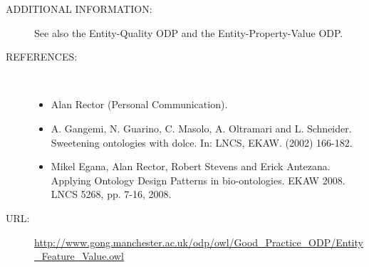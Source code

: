 \begin{description}
\item [ADDITIONAL INFORMATION:] See also the Entity-Quality ODP and the Entity-Property-Value ODP.

\item [REFERENCES: ] ~\begin{itemize}
\item Alan Rector (Personal Communication).
\item A. Gangemi, N. Guarino, C. Masolo, A. Oltramari and L. Schneider. Sweetening
ontologies with dolce. In: LNCS, EKAW. (2002) 166-182.
\item Mikel Egana, Alan Rector, Robert Stevens and Erick Antezana. Applying Ontology Design Patterns in bio-ontologies. EKAW 2008. LNCS 5268, pp. 7-16, 2008.\end{itemize}
\item [URL: ] \url{http://www.gong.manchester.ac.uk/odp/owl/Good_Practice_ODP/Entity_Feature_Value.owl} \end{description}